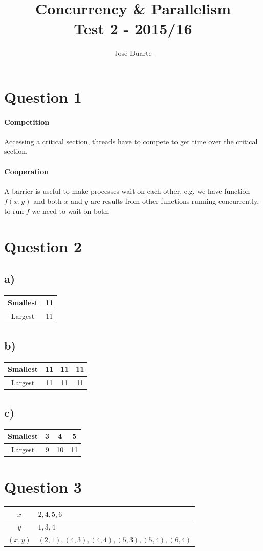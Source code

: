\documentclass[a4paper,twocolumn]{article}
\author{José Duarte}
\title{Concurrency \& Parallelism\\Test 2 - 2015/16}
\begin{document}
\maketitle
\section{Question 1}
\paragraph{Competition}
Accessing a critical section, threads have to compete to get time over the critical section.
\paragraph{Cooperation}
A barrier is useful to make processes wait on each other,
e.g. we have function $f(x, y)$ and both $x$ and $y$ are results from other functions running concurrently,
to run $f$ we need to wait on both.
\section{Question 2}
\subsection{a)}
\begin{tabular}{c|c}
    Smallest & 11 \\
    \hline
    Largest  & 11 \\
\end{tabular}
\subsection{b)}
\begin{tabular}{c|c c c}
    Smallest & 11 & 11 & 11 \\
    \hline
    Largest  & 11 & 11 & 11 \\
\end{tabular}
\subsection{c)}
\begin{tabular}{c|c c c}
    Smallest & 3 & 4 & 5 \\
    \hline
    Largest  & 9 & 10 & 11\\
\end{tabular}
\section{Question 3}
\begin{tabular}{c | l}
    $x$ & $2, 4, 5, 6$ \\
    \hline
    $y$ & $1, 3, 4$ \\
    \hline
    $(x, y)$ & $(2, 1), (4, 3), (4, 4), (5, 3), (5, 4), (6, 4)$ \\
\end{tabular}
\end{document}
